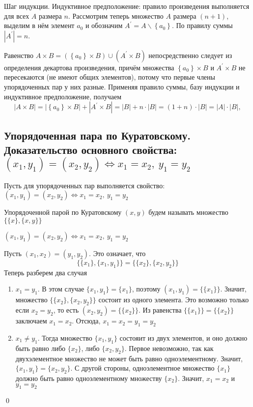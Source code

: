 \documentclass[a4paper]{article}
\begin{document}
Шаг индукции. Индуктивное предположение: правило произведения выполняется для всех $A$ размера $n$. Рассмотрим теперь множество $A$ размера $(n+1)$, выделим в нём элемент $a_0$ и обозначим $A^{\prime}=A \backslash\left\{a_0\right\}$. По правилу суммы $\left|A^{\prime}\right|=n$. 

Равенство $A \times B=\left(\left\{a_0\right\} \times B\right) \cup\left(A^{\prime} \times B\right)$ непосредственно следует из определения декартова произведения, причём множества $\left\{a_0\right\} \times B$ и $A^{\prime} \times B$ не пересекаются (не имеют общих элементов), потому что первые члены упорядоченных пар у них разные. Применяя правило суммы, базу индукции и индуктивное предположение, получаем
$$
|A \times B|=\left|\left\{a_0\right\} \times B\right|+\left|A^{\prime} \times B\right|=|B|+n \cdot|B|=(1+n) \cdot|B|=|A| \cdot|B|,
$$


\subsection{Упорядоченная пара по Куратовскому. Доказательство основного свойства: $(x_1,y_1)=(x_2,y_2)\Leftrightarrow x_1=x_2,\ y_1=y_2$}
\label{sec:2.5} Пусть для упорядоченных пар выполняется свойство: $(x_1, y_1)=(x_2,y_2)\Leftrightarrow x_1=x_2,\ y_1=y_2$

 Упорядоченной парой по Куратовскому $(x,y)$ будем называть
множество $\{\{x\},\{x,y\}\}$

\theorem $(x_1, y_1)=(x_2,y_2)\Longleftrightarrow x_1=x_2,\ y_1=y_2$

\proof Пусть $(x_1,x_2)=(y_1,y_2)$. Это означает, что
\begin{equation*}
    \{\{x_1\},\{x_1,y_1\}\}=\{\{x_2\},\{x_2,y_2\}\}
\end{equation*}
Теперь разберем два случая
\begin{enumerate}
    \item $x_1=y_1$. В этом случае $\{x_1,y_1\}=\{x_1\}$, поэтому $(x_1,y_1)=\{\{x_1\}\}$. Значит, множество $\{\{x_2\},\{x_2,y_2\}\}$ состоит из одного элемента. Это возможно только если $x_2=y_2$, то есть $(x_2,y_2)=\{\{x_2\}\}$. Из равенства $\{\{x_1\}\}=\{\{x_2\}\}$ заключаем $x_1=x_2$. Отсюда, $x_1=x_2=y_1=y_2$
    \item $x_1\ne y_1$. Тогда множество $\{x_1,y_1\}$ состояит из двух элементов, и оно должно быть равно либо $\{x_2\}$, либо $\{x_2,y_2\}$. Первое невозможно, так как двухэлементное множество не может быть равно одноэлементному. Значит, $\{x_1,y_1\}=\{x_2,y_2\}$. С другой стороны, одноэлементное множество $\{x_1\}$ должно быть равно одноэлементному множеству $\{x_2\}$. Значит, $x_1=x_2$ и $y_1=y_2$
\end{enumerate}\qed 
\end{document}

